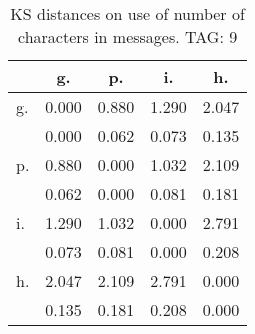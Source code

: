 \begin{table}[h!]
\begin{center}
\begin{tabular}{| l | c | c | c | c |}\hline
 & g. & p. & i. & h. \\\hline
g. & 0.000  & 0.880  & 1.290  & 2.047 \\\hline
 & 0.000  & 0.062  & 0.073  & 0.135 \\\hline
p. & 0.880  & 0.000  & 1.032  & 2.109 \\\hline
 & 0.062  & 0.000  & 0.081  & 0.181 \\\hline
i. & 1.290  & 1.032  & 0.000  & 2.791 \\\hline
 & 0.073  & 0.081  & 0.000  & 0.208 \\\hline
h. & 2.047  & 2.109  & 2.791  & 0.000 \\\hline
 & 0.135  & 0.181  & 0.208  & 0.000 \\\hline
\end{tabular}
\caption{KS distances on use of number of characters in messages. TAG: 9}
\end{center}
\end{table}